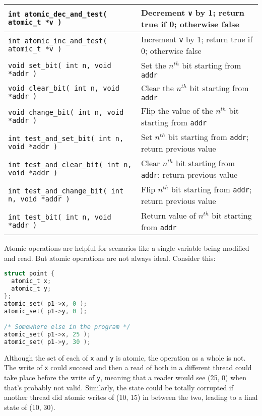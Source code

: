 \begin{center}
\begin{tabular}{l|l}
\texttt{int atomic\_dec\_and\_test( atomic\_t *v )} & Decrement \texttt{v} by 1; return true if 0; otherwise false\\\hline

\texttt{int atomic\_inc\_and\_test( atomic\_t *v )} & Increment \texttt{v} by 1; return true if 0; otherwise false\\ \hline\hline

\texttt{void set\_bit( int n, void *addr )} &  Set the $n^{th}$ bit starting from \texttt{addr}\\\hline

\texttt{void clear\_bit( int n, void *addr )} &  Clear the $n^{th}$ bit starting from \texttt{addr}\\\hline

\texttt{void change\_bit( int n, void *addr )} &  Flip the value of the $n^{th}$ bit starting from \texttt{addr}\\\hline

\texttt{int test\_and\_set\_bit( int n, void *addr )} &  Set $n^{th}$ bit starting from \texttt{addr}; return previous value\\\hline

\texttt{int test\_and\_clear\_bit( int n, void *addr )} &  Clear $n^{th}$ bit starting from \texttt{addr}; return previous value\\\hline

\texttt{int test\_and\_change\_bit( int n, void *addr )} &  Flip $n^{th}$ bit starting from \texttt{addr}; return previous value\\\hline

\texttt{int test\_bit( int n, void *addr )} &  Return value of $n^{th}$ bit starting from \texttt{addr}\\\hline

\end{tabular}
\end{center}

Atomic operations are helpful for scenarios like a single variable being modified and read. But atomic operations are not always ideal. Consider this:

\begin{lstlisting}[language=C]
struct point {
  atomic_t x;
  atomic_t y;
};
atomic_set( p1->x, 0 );
atomic_set( p1->y, 0 );

/* Somewhere else in the program */
atomic_set( p1->x, 25 );
atomic_set( p1->y, 30 );
\end{lstlisting}

Although the set of each of \texttt{x} and \texttt{y} is atomic, the operation as a whole is not. The write of \texttt{x} could succeed and then a read of both in a different thread could take place before the write of \texttt{y}, meaning that a reader would see (25, 0) when that's probably not valid. Similarly, the state could be totally corrupted if another thread did atomic writes of (10, 15) in between the two, leading to a final state of (10, 30). 

